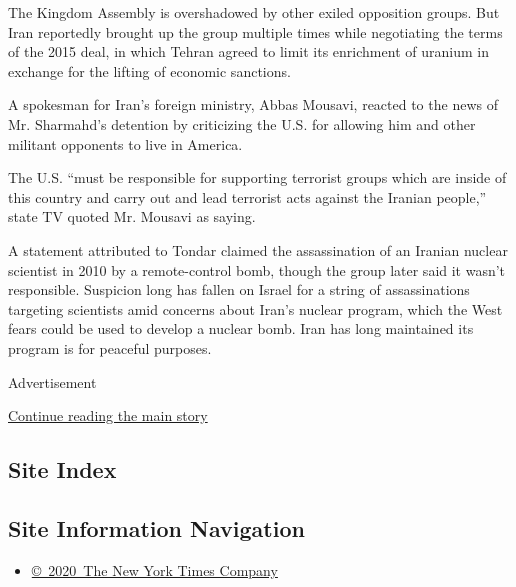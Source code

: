 The Kingdom Assembly is overshadowed by other exiled opposition groups.
But Iran reportedly brought up the group multiple times while
negotiating the terms of the 2015 deal, in which Tehran agreed to limit
its enrichment of uranium in exchange for the lifting of economic
sanctions.

A spokesman for Iran's foreign ministry, Abbas Mousavi, reacted to the
news of Mr. Sharmahd's detention by criticizing the U.S. for allowing
him and other militant opponents to live in America.

The U.S. ``must be responsible for supporting terrorist groups which are
inside of this country and carry out and lead terrorist acts against the
Iranian people,'' state TV quoted Mr. Mousavi as saying.

A statement attributed to Tondar claimed the assassination of an Iranian
nuclear scientist in 2010 by a remote-control bomb, though the group
later said it wasn't responsible. Suspicion long has fallen on Israel
for a string of assassinations targeting scientists amid concerns about
Iran's nuclear program, which the West fears could be used to develop a
nuclear bomb. Iran has long maintained its program is for peaceful
purposes.

Advertisement

\protect\hyperlink{after-bottom}{Continue reading the main story}

\hypertarget{site-index}{%
\subsection{Site Index}\label{site-index}}

\hypertarget{site-information-navigation}{%
\subsection{Site Information
Navigation}\label{site-information-navigation}}

\begin{itemize}
\tightlist
\item
  \href{https://help.nytimes3xbfgragh.onion/hc/en-us/articles/115014792127-Copyright-notice}{©~2020~The
  New York Times Company}
\end{itemize}

